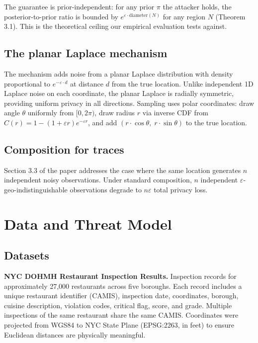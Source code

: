 \documentclass[11pt]{article}
\begin{document}
The guarantee is prior-independent: for any prior $\pi$ the attacker holds, the posterior-to-prior ratio is bounded by $e^{\varepsilon \cdot \text{diameter}(N)}$ for any region $N$ (Theorem 3.1). This is the theoretical ceiling our empirical evaluation tests against.

\subsection{The planar Laplace mechanism}

The mechanism adds noise from a planar Laplace distribution with density proportional to $e^{-\varepsilon \cdot d}$ at distance $d$ from the true location. Unlike independent 1D Laplace noise on each coordinate, the planar Laplace is radially symmetric, providing uniform privacy in all directions. Sampling uses polar coordinates: draw angle $\theta$ uniformly from $[0, 2\pi)$, draw radius $r$ via inverse CDF from $C(r) = 1 - (1 + \varepsilon r)e^{-\varepsilon r}$, and add $(r \cdot \cos\theta,\; r \cdot \sin\theta)$ to the true location.

\subsection{Composition for traces}

Section 3.3 of the paper addresses the case where the same location generates $n$ independent noisy observations. Under standard composition, $n$ independent $\varepsilon$-geo-indistinguishable observations degrade to $n\varepsilon$ total privacy loss.

\section{Data and Threat Model}

\subsection{Datasets}

\textbf{NYC DOHMH Restaurant Inspection Results.} Inspection records for approximately 27,000 restaurants across five boroughs. Each record includes a unique restaurant identifier (CAMIS), inspection date, coordinates, borough, cuisine description, violation codes, critical flag, score, and grade. Multiple inspections of the same restaurant share the same CAMIS. Coordinates were projected from WGS84 to NYC State Plane (EPSG:2263, in feet) to ensure Euclidean distances are physically meaningful.
\end{document}
